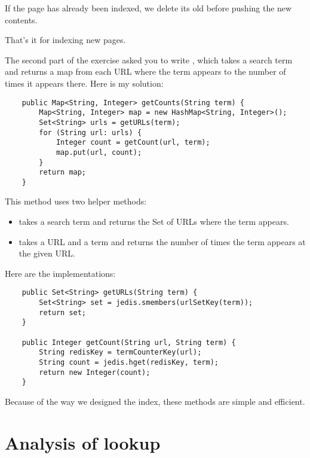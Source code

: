 \documentclass[12pt]{book}
\theoremstyle{exercise}
\begin{document}
If the page has already been indexed, we delete its old
 before pushing the new contents.

That's it for indexing new pages.


The second part of the exercise asked you to write , which
takes a search term and returns a map from each URL where the term
appears to the number of times it appears there. Here is my solution:

\begin{verbatim}
    public Map<String, Integer> getCounts(String term) {
        Map<String, Integer> map = new HashMap<String, Integer>();
        Set<String> urls = getURLs(term);
        for (String url: urls) {
            Integer count = getCount(url, term);
            map.put(url, count);
        }
        return map;
    }
\end{verbatim}

This method uses two helper methods:

\begin{itemize}

\item
   takes a search term and returns the Set of URLs where
  the term appears.

\item
   takes a URL and a term and returns the number of
  times the term appears at the given URL.

\end{itemize}

Here are the implementations:

\begin{verbatim}
    public Set<String> getURLs(String term) {
        Set<String> set = jedis.smembers(urlSetKey(term));
        return set;
    }

    public Integer getCount(String url, String term) {
        String redisKey = termCounterKey(url);
        String count = jedis.hget(redisKey, term);
        return new Integer(count);
    }
\end{verbatim}

Because of the way we designed the index, these methods are simple and
efficient.


\section{Analysis of lookup}
\label{analysis-of-lookup}
\end{document}
